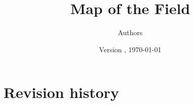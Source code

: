 \documentclass[10pt,a4paper]{article}
\title{\Large Map of the Field}
\author{Authors}
\date{Version \articleversion, \today}
\begin{document}
\maketitle
\statusbox










\section*{Revision history}
\versiontable
\end{document}
